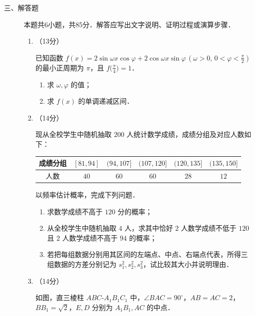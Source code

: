 \begin{description}
    \item[三、解答题] 本题共6小题，共85分．解答应写出文字说明、证明过程或演算步骤．
    \begin{enumerate}[leftmargin=5pt]
      \addtocounter{enumi}{+15}
        \item （13分）

        已知函数 $f(x)=2\sin\omega x\cos\varphi+2\cos\omega x\sin\varphi\,(\omega>0,\,0<\varphi<\frac{\pi}{2})$ 的最小正周期为 $\pi$，且 $f\bigl(\frac{\pi}{4}\bigr)=1$．

        \begin{enumerate}[label=(\arabic*)]
            \item 求 $\omega,\varphi$ 的值；
            \item 求 $f(x)$ 的单调递减区间．
        \end{enumerate}

        \item （14分）

        现从全校学生中随机抽取 $200$ 人统计数学成绩，成绩分组及对应人数如下：

        {\centering\begin{tabular}{|c|c|c|c|c|c|}
        \hline
        成绩分组 & $[81,94]$ & $(94,107]$ & $(107,120]$ & $(120,135]$ & $(135,150]$ \\
        \hline
        人数 & $40$ & $60$ & $60$ & $28$ & $12$ \\
        \hline
        \end{tabular}\par}

        以频率估计概率，完成下列问题．

        \begin{enumerate}[label=(\arabic*)]
            \item 求数学成绩不高于 $120$ 分的概率；
            \item 从全校学生中随机抽取 $4$ 人，求其中恰好 $2$ 人数学成绩不低于 $120$ 且 $2$ 人数学成绩不高于 $94$ 的概率；
            \item 若把每组数据分别用其区间的左端点、中点、右端点代表，所得三组数据的方差分别记为 $s_1^2,s_2^2,s_3^2$，试比较其大小并说明理由．
        \end{enumerate}

        \item （14分）

        如图，直三棱柱 $ABC$-$A_1B_1C_1$ 中，$\angle BAC=90^\circ$，$AB=AC=2$，$BB_1=\sqrt{2}$，$E,D$ 分别为 $A_1B_1,AC$ 的中点．


\end{enumerate}
\end{description}
